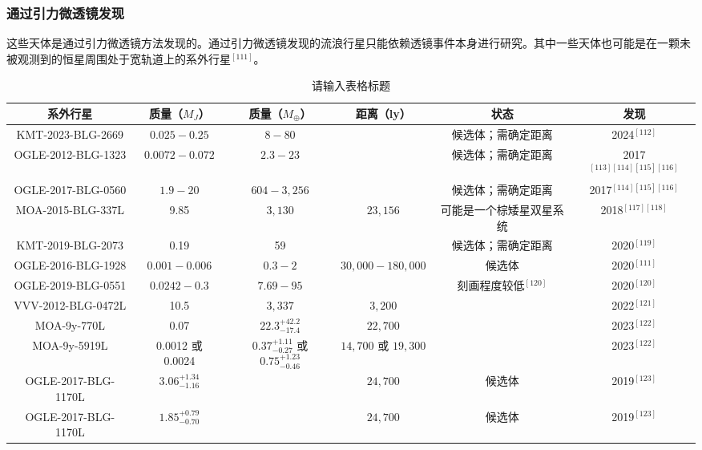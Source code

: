 \subsubsection{通过引力微透镜发现}
这些天体是通过引力微透镜方法发现的。通过引力微透镜发现的流浪行星只能依赖透镜事件本身进行研究。其中一些天体也可能是在一颗未被观测到的恒星周围处于宽轨道上的系外行星$^{[111]}$。
\begin{table}[ht]
\centering
\caption{请输入表格标题}\label{tab_RoPl2}
\begin{tabular}{|c|c|c|c|c|c|}
\hline
\textbf{系外行星} & \textbf{质量（$M_J$}） & \textbf{质量（$M_\oplus$）}  & \textbf{距离（ly}） & \textbf{状态}  & \textbf{发现} \\
\hline
KMT-2023-BLG-2669 & $0.025-0.25$ & $8-80$ & & 候选体；需确定距离 & 2024$^{[112]}$\\
\hline
OGLE-2012-BLG-1323 & $0.0072-0.072$ & $2.3-23$ & &  候选体；需确定距离 & 2017$^{[113][114][115][116]}$\\
\hline
OGLE-2017-BLG-0560 & $1.9-20$ & $604-3{,}256$ &  & 候选体；需确定距离 & 2017$^{[114][115][116]}$\\
\hline
MOA-2015-BLG-337L & 9.85 & $3{,}130$ & $23{,}156$ & 可能是一个棕矮星双星系统 & 2018$^{[117][118]}$\\
\hline
KMT-2019-BLG-2073 & 0.19 & 59 &  & 候选体；需确定距离 & 2020$^{[119]}$\\
\hline
OGLE-2016-BLG-1928 & $0.001-0.006$ & $0.3-2$ & $30{,}000-180{,}000$  & 候选体 & 2020$^{[111]}$\\
\hline
OGLE-2019-BLG-0551 & $0.0242-0.3$ & $7.69-95$ &  &  刻画程度较低$^{[120]}$ & 2020$^{[120]}$\\
\hline
VVV-2012-BLG-0472L & 10.5 & $3{,}337$ & $3{,}200$ &  & 2022$^{[121]}$\\
\hline
MOA-9y-770L & 0.07 & $22.3^{+42.2}_{-17.4}$ & $22{,}700$ & & 2023$^{[122]}$\\
\hline
MOA-9y-5919L & 0.0012 或 0.0024 & $0.37^{+1.11}_{-0.27}$ 或 $0.75^{+1.23}_{-0.46}$ & $14{,}700$ 或 $19{,}300$ &  & 2023$^{[122]}$\\
\hline
OGLE-2017-BLG-1170L & $3.06^{+1.34}_{-1.16}$ &  & $24{,}700$ & 候选体 & 2019$^{[123]}$\\
\hline
OGLE-2017-BLG-1170L & $1.85^{+0.79}_{-0.70}$ & &  $24{,}700$ & 候选体  & 2019$^{[123]}$\\
\hline
\end{tabular}
\end{table}




